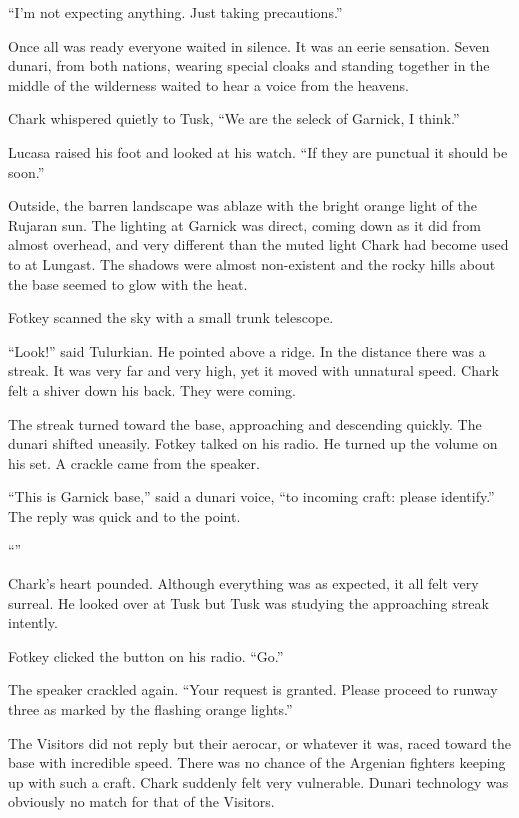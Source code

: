 ``I'm not expecting anything. Just taking precautions.''

Once all was ready everyone waited in silence. It was an eerie sensation. Seven dunari, from
both nations, wearing special cloaks and standing together in the middle of the wilderness
waited to hear a voice from the heavens.

Chark whispered quietly to Tusk, ``We are the seleck of Garnick, I think.''

Lucasa raised his foot and looked at his watch. ``If they are punctual it should be soon.''

Outside, the barren landscape was ablaze with the bright orange light of the Rujaran sun. The
lighting at Garnick was direct, coming down as it did from almost overhead, and very different
than the muted light Chark had become used to at Lungast. The shadows were almost non-existent
and the rocky hills about the base seemed to glow with the heat.

Fotkey scanned the sky with a small trunk telescope.

``Look!'' said Tulurkian. He pointed above a ridge. In the distance there was a streak. It was
very far and very high, yet it moved with unnatural speed. Chark felt a shiver down his back.
They were coming.

The streak turned toward the base, approaching and descending quickly. The dunari shifted
uneasily. Fotkey talked on his radio. He turned up the volume on his set. A crackle came from
the speaker.

``This is Garnick base,'' said a dunari voice, ``to incoming craft: please identify.'' The reply
was quick and to the point.

``''

Chark's heart pounded. Although everything was as expected, it all felt very surreal. He looked
over at Tusk but Tusk was studying the approaching streak intently.

Fotkey clicked the button on his radio. ``Go.''

The speaker crackled again. ``Your request is granted. Please proceed to runway three as marked
by the flashing orange lights.''

The Visitors did not reply but their aerocar, or whatever it was, raced toward the base with
incredible speed. There was no chance of the Argenian fighters keeping up with such a craft.
Chark suddenly felt very vulnerable. Dunari technology was obviously no match for that of the
Visitors.

